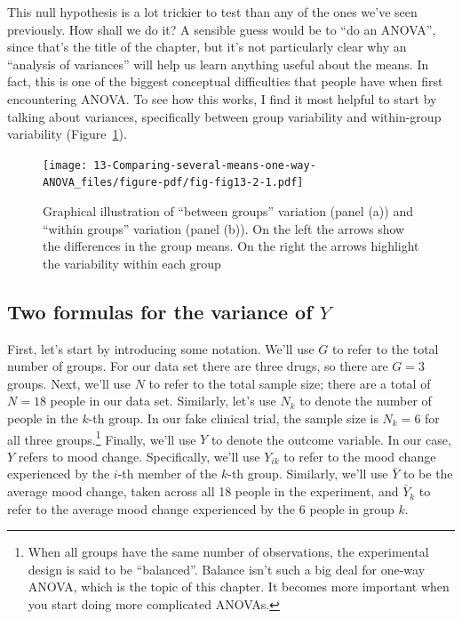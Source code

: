 \documentclass[
  a4paper,
]{book}
\begin{document}
This null hypothesis is a lot trickier to test than any of the ones
we've seen previously. How shall we do it? A sensible guess would be to
``do an ANOVA'', since that's the title of the chapter, but it's not
particularly clear why an ``analysis of variances'' will help us learn
anything useful about the means. In fact, this is one of the biggest
conceptual difficulties that people have when first encountering ANOVA.
To see how this works, I find it most helpful to start by talking about
variances, specifically between group variability and within-group
variability (Figure~\ref{fig-fig13-2}).

\begin{figure}

\texttt{[image: 13-Comparing-several-means-one-way-ANOVA\_files/figure-pdf/fig-fig13-2-1.pdf]} \hfill{}

\caption{\label{fig-fig13-2}Graphical illustration of ``between groups''
variation (panel (a)) and ``within groups'' variation (panel (b)). On
the left the arrows show the differences in the group means. On the
right the arrows highlight the variability within each group}

\end{figure}

\hypertarget{two-formulas-for-the-variance-of-y}{%
\subsection{\texorpdfstring{Two formulas for the variance of
\(Y\)}{Two formulas for the variance of Y}}\label{two-formulas-for-the-variance-of-y}}

First, let's start by introducing some notation. We'll use \(G\) to
refer to the total number of groups. For our data set there are three
drugs, so there are \(G = 3\) groups. Next, we'll use \(N\) to refer to
the total sample size; there are a total of \(N = 18\) people in our
data set. Similarly, let's use \(N_k\) to denote the number of people in
the \(k\)-th group. In our fake clinical trial, the sample size is
\(N_k = 6\) for all three groups.\footnote{When all groups have the same
  number of observations, the experimental design is said to be
  ``balanced''. Balance isn't such a big deal for one-way ANOVA, which
  is the topic of this chapter. It becomes more important when you start
  doing more complicated ANOVAs.} Finally, we'll use \(Y\) to denote the
outcome variable. In our case, \(Y\) refers to mood change.
Specifically, we'll use \(Y_{ik}\) to refer to the mood change
experienced by the \(i\)-th member of the \(k\)-th group. Similarly,
we'll use \(\bar{Y}\) to be the average mood change, taken across all 18
people in the experiment, and \(\bar{Y}_k\) to refer to the average mood
change experienced by the 6 people in group \(k\).
\end{document}
